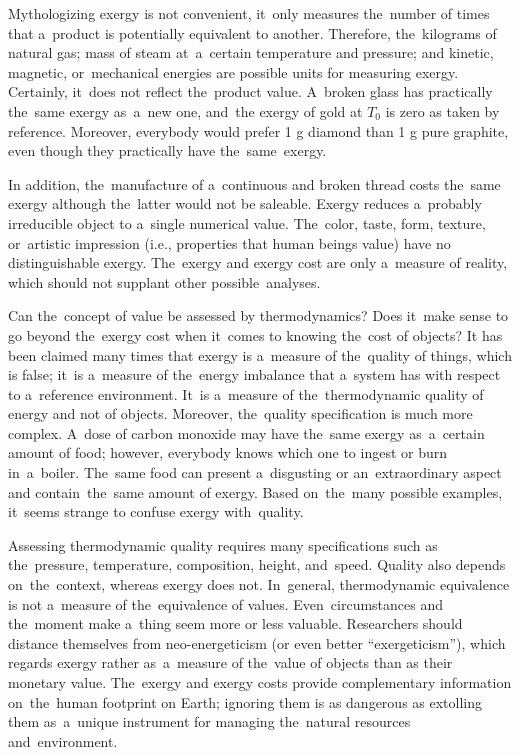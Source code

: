 \documentclass[energies,article,accept,moreauthors,pdftex]{Definitions/mdpi}
\begin{document}
Mythologizing exergy is not convenient, it~only measures the~number of times that a~product is potentially equivalent to another. Therefore, the~kilograms of natural gas; mass of steam at~a~certain temperature and pressure; and kinetic, magnetic, or~mechanical energies are possible units for measuring exergy. Certainly, it~does not reflect the~product value. A~broken glass has practically the~same exergy as~a~new one, and~the  exergy of gold at $T_0$ is zero as taken by reference. Moreover, everybody would prefer 1 g diamond than 1 g pure graphite, even though they practically have the~same~exergy.

In addition, the~manufacture of a~continuous and broken thread costs the~same exergy although the~latter would not be saleable. Exergy reduces a~probably irreducible object to a~single numerical value. The~color, taste, form, texture, or~artistic impression (i.e., properties that human beings value) have no distinguishable exergy. The~exergy and exergy cost are only a~measure of reality, which should not supplant other possible~analyses.

Can the~concept of value be assessed by thermodynamics? Does it~make sense to go beyond the~exergy cost when it~comes to knowing the~cost of objects? It has been claimed many times that exergy is a~measure of the~quality of things, which is false; it~is a~measure of the~energy imbalance that a~system has with respect to a~reference environment. It~is a~measure of the~thermodynamic quality of energy and not of objects. Moreover, the~quality specification is much more complex. A~dose of carbon monoxide may have the~same exergy as~a~certain amount of food; however, everybody knows which one to ingest or burn in~a~boiler. The~same food can present a~disgusting or an~extraordinary aspect and contain~the~same amount of exergy. Based on~the~many possible examples, it~seems strange to confuse exergy with~quality.

Assessing thermodynamic quality requires many specifications such as the~pressure, temperature, composition, height, and~speed. Quality also depends on~the~context, whereas exergy does not. In~general, thermodynamic equivalence is not a~measure of the~equivalence of values. Even~circumstances and the~moment make a~thing seem more or less valuable. Researchers should distance themselves from neo-energeticism (or even better “exergeticism”), which regards exergy rather as~a~measure of the~value of objects than as their monetary value. The~exergy and exergy costs provide complementary information on~the~human footprint on Earth; ignoring them is as dangerous as extolling them as~a~unique instrument for managing the~natural resources and~environment.
\end{document}
